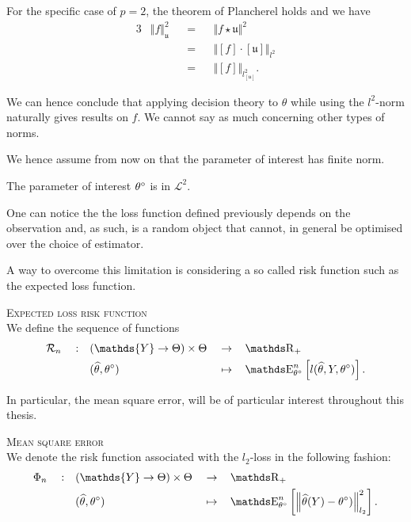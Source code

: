 \begin{Liste}[]
For the specific case of $p=2$, the theorem of Plancherel holds and we have
\begin{alignat*}{3}
&\Vert f \Vert^{2}_{\mathfrak{u}} &&=&& \Vert f \star \mathfrak{u} \Vert^{2}\\
& &&=&& \Vert [f] \cdot [\mathfrak{u}]\Vert_{l^{2}}\\
& &&=&& \Vert [f] \Vert_{l_{[\mathfrak{u}]}^{2}}.
\end{alignat*}

\bigskip

We can hence conclude that applying decision theory to $\theta$ while using the $l^{2}$-norm naturally gives results on $f$.
We cannot say as much concerning other types of norms.

We hence assume from now on that the parameter of interest has finite norm.

\begin{as}\label{AS_INTRO_FREQ_DECISION_THETAL2}
The parameter of interest ${\theta^{\circ}_{}}$ is in $\mathcal{L}^{2}$.
\end{as}

\item[\mylabel{INTRO_FREQ_DECISION_RISKFUNCION}{ \bfseries{The risk function} $\left(\mathcal{R}_{n} : (\{\mathds{Y} \rightarrow \Theta\} \times \Theta) \rightarrow \R_{+}\right)_{n \in \N}$}]

One can notice the the loss function defined previously depends on the observation and, as such, is a random object that cannot, in general be optimised over the choice of estimator.

A way to overcome this limitation is considering a so called risk function such as the expected loss function.

\begin{de}{\textsc{Expected loss risk function}\\}\label{DE_INTRO_FREQ_DECISION_RISKFUNCTION_EXPECTEDLOSS}
We define the sequence of functions
\begin{alignat*}{5}
& \mathcal{R}_{n} && : && (\mathds{Y} \rightarrow \Theta) \times \Theta && \rightarrow && \R_{+}\\
& && && (\widehat{\theta}, \fxdf) && \mapsto && \E_{\theta^{\circ}}^{n}\left[l(\widehat{\theta}, Y, \fxdf)\right].
\end{alignat*}
\end{de}

In particular, the mean square error, will be of particular interest throughout this thesis.

\begin{de}{\textsc{Mean square error}\\}\label{DE_INTRO_FREQ_DECISION_RISKFUNCTION_MEANSQUAREERROR}
We denote the risk function associated with the $l_{2}$-loss in the following fashion:
\begin{alignat*}{5}
& \Phi_{n} && : && (\mathds{Y} \rightarrow \Theta) \times \Theta && \rightarrow && \R_{+}\\
& && && (\widehat{\theta}, \fxdf) && \mapsto && \E_{\theta^{\circ}}^{n}\left[\left\Vert \widehat{\theta}(Y) - \fxdf)\right\Vert^{2}_{l_{2}}\right].
\end{alignat*}
\end{de}


\end{Liste}
